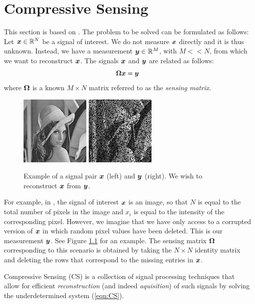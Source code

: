 \chapter{Compressive Sensing}
This section is based on \cite{pilikos2014}. 
The problem to be solved can be formulated as follows: Let $\boldsymbol x \in \mathbb{R}^N$ be a signal of interest.
We do not measure $\boldsymbol x$ directly and it is thus unknown.
Instead, we have a measurement $\boldsymbol y \in \mathbb{R}^M$, with $M << N$, from which we want to reconstruct $\boldsymbol x$.
The signals $\boldsymbol x$ and $\boldsymbol y$ are related as follows:
\begin{equation}
\label{eqn:CS}
\boldsymbol \Omega \boldsymbol x = \boldsymbol y
\end{equation}
where $\boldsymbol \Omega$ is a known $M\times N$ matrix referred to as the \emph{sensing matrix}.

\begin{figure}
\label{fig:lenna}
\center
\includegraphics{Images/128.png}
\includegraphics{Images/0.png}
\caption{Example of a signal pair $\boldsymbol x$ (left) and $\boldsymbol y$ (right). We wish to reconstruct $\boldsymbol x$ from $\boldsymbol y$.}
\end{figure}

For example, in \cite{pilikos2014}, the signal of interest $\boldsymbol x$ is an image, so that $N$ is equal to the total number of pixels in the image and $x_i$ is equal to the intensity of the corresponding pixel.
However, we imagine that we have only access to a corrupted version of $\boldsymbol x$ in which random pixel values have been deleted.
This is our measurement $\boldsymbol y$. See Figure \ref{fig:lenna} for an example.
The sensing matrix $\boldsymbol\Omega$ corresponding to this scenario is obtained by taking the $N\times N$ identity matrix and deleting the rows that correspond to the missing entries in $\boldsymbol x$.

Compressive Sensing (CS) is a collection of signal processing techniques that allow for efficient \emph{reconstruction} (and indeed \emph{aquisition}) of such signals by solving the underdetermined system (\ref{eqn:CS}).


